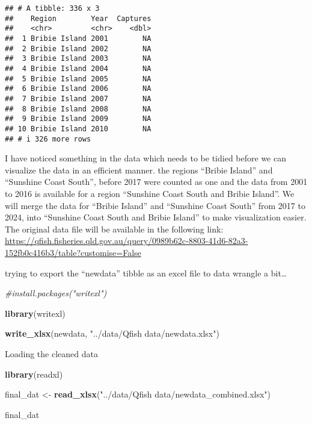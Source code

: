 \documentclass[
]{article}
\newenvironment{Shaded}{\begin{snugshade}}{\end{snugshade}}
\newcommand{\CommentTok}[1]{\textcolor[rgb]{0.56,0.35,0.01}{\textit{#1}}}
\newcommand{\FunctionTok}[1]{\textcolor[rgb]{0.13,0.29,0.53}{\textbf{#1}}}
\newcommand{\NormalTok}[1]{#1}
\newcommand{\OtherTok}[1]{\textcolor[rgb]{0.56,0.35,0.01}{#1}}
\newcommand{\StringTok}[1]{\textcolor[rgb]{0.31,0.60,0.02}{#1}}
\begin{document}
\begin{verbatim}
## # A tibble: 336 x 3
##    Region        Year  Captures
##    <chr>         <chr>    <dbl>
##  1 Bribie Island 2001        NA
##  2 Bribie Island 2002        NA
##  3 Bribie Island 2003        NA
##  4 Bribie Island 2004        NA
##  5 Bribie Island 2005        NA
##  6 Bribie Island 2006        NA
##  7 Bribie Island 2007        NA
##  8 Bribie Island 2008        NA
##  9 Bribie Island 2009        NA
## 10 Bribie Island 2010        NA
## # i 326 more rows
\end{verbatim}

I have noticed something in the data which needs to be tidied before we
can visualize the data in an efficient manner. the regions ``Bribie
Island'' and ``Sunshine Coast South'', before 2017 were counted as one
and the data from 2001 to 2016 is available for a region ``Sunshine
Coast South and Bribie Island''. We will merge the data for ``Bribie
Island'' and ``Sunshine Coast South'' from 2017 to 2024, into ``Sunshine
Coast South and Bribie Island'' to make visualization easier. The
original data file will be available in the following link:
\url{https://qfish.fisheries.qld.gov.au/query/0989b62c-8803-41d6-82a3-152fb0c416b3/table?customise=False}

trying to export the ``newdata'' tibble as an excel file to data wrangle
a bit\ldots{}

\begin{Shaded}
\begin{Highlighting}[]
\CommentTok{\#install.packages("writexl")}

\FunctionTok{library}\NormalTok{(writexl)}

\FunctionTok{write\_xlsx}\NormalTok{(newdata, }\StringTok{"../data/Qfish data/newdata.xlsx"}\NormalTok{)}
\end{Highlighting}
\end{Shaded}

Loading the cleaned data

\begin{Shaded}
\begin{Highlighting}[]
\FunctionTok{library}\NormalTok{(readxl)}

\NormalTok{final\_dat }\OtherTok{\textless{}{-}} \FunctionTok{read\_xlsx}\NormalTok{(}\StringTok{"../data/Qfish data/newdata\_combined.xlsx"}\NormalTok{)}

\NormalTok{final\_dat}
\end{Highlighting}
\end{Shaded}
\end{document}
